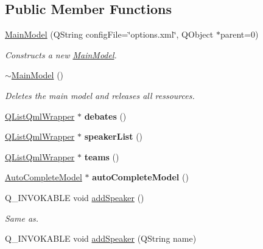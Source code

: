 \subsection*{Public Member Functions}
\begin{DoxyCompactItemize}
\item 
\hyperlink{classMainModel_a6c11a3942ed91eda77c4901d3d4f95b5}{Main\-Model} (Q\-String config\-File=\char`\"{}options.\-xml\char`\"{}, Q\-Object $\ast$parent=0)
\begin{DoxyCompactList}\small\item\em Constructs a new {\ttfamily \hyperlink{classMainModel}{Main\-Model}}. \end{DoxyCompactList}\item 
\hypertarget{classMainModel_af573c08c12cc35fb7a961b98a559d21b}{\hyperlink{classMainModel_af573c08c12cc35fb7a961b98a559d21b}{$\sim$\-Main\-Model} ()}\label{classMainModel_af573c08c12cc35fb7a961b98a559d21b}

\begin{DoxyCompactList}\small\item\em Deletes the main model and releases all ressources. \end{DoxyCompactList}\item 
\hypertarget{classMainModel_a07df104ce3e2f27de3f5f4a1abe554eb}{\hyperlink{classQListQmlWrapper}{Q\-List\-Qml\-Wrapper} $\ast$ {\bfseries debates} ()}\label{classMainModel_a07df104ce3e2f27de3f5f4a1abe554eb}

\item 
\hypertarget{classMainModel_a0ee2c2d98c9384a91e3a0eda721eb9c3}{\hyperlink{classQListQmlWrapper}{Q\-List\-Qml\-Wrapper} $\ast$ {\bfseries speaker\-List} ()}\label{classMainModel_a0ee2c2d98c9384a91e3a0eda721eb9c3}

\item 
\hypertarget{classMainModel_a27a5d15b68e83bb899e6208cc8dd1a18}{\hyperlink{classQListQmlWrapper}{Q\-List\-Qml\-Wrapper} $\ast$ {\bfseries teams} ()}\label{classMainModel_a27a5d15b68e83bb899e6208cc8dd1a18}

\item 
\hypertarget{classMainModel_a70a4770c8bae2da24bf447203da8f8c3}{\hyperlink{classAutoCompleteModel}{Auto\-Complete\-Model} $\ast$ {\bfseries auto\-Complete\-Model} ()}\label{classMainModel_a70a4770c8bae2da24bf447203da8f8c3}

\item 
Q\-\_\-\-I\-N\-V\-O\-K\-A\-B\-L\-E void \hyperlink{classMainModel_adf2889da5df77b5fc400d342b3f5ed41}{add\-Speaker} ()
\begin{DoxyCompactList}\small\item\em Same as. \end{DoxyCompactList}\item 
\hypertarget{classMainModel_a3383a2c9e268f9b2d0f132c1113d4ecd}{Q\-\_\-\-I\-N\-V\-O\-K\-A\-B\-L\-E void \hyperlink{classMainModel_a3383a2c9e268f9b2d0f132c1113d4ecd}{add\-Speaker} (Q\-String name)}\label{classMainModel_a3383a2c9e268f9b2d0f132c1113d4ecd}


\end{DoxyCompactItemize}
